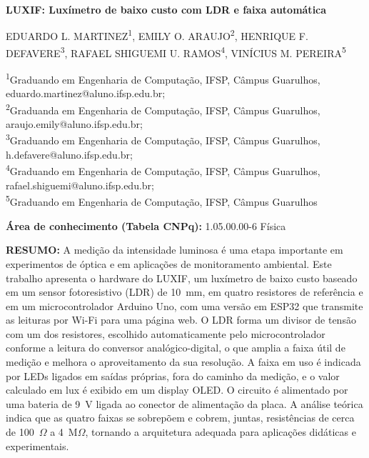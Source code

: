 \documentclass[11pt,a4paper]{article}
\begin{document}
\begin{center}
	{\Large\bfseries LUXIF: Luxímetro de baixo custo com LDR e faixa automática}

	\vspace{12pt}

	{\small
	EDUARDO L. MARTINEZ\textsuperscript{1}, EMILY O. ARAUJO\textsuperscript{2},
	HENRIQUE F. DEFAVERE\textsuperscript{3}, RAFAEL SHIGUEMI U. RAMOS\textsuperscript{4},
	VINÍCIUS M. PEREIRA\textsuperscript{5}}
\end{center}

\vspace{4pt}
{\footnotesize
\noindent\textsuperscript{1}Graduando em Engenharia de Computação, IFSP, Câmpus Guarulhos, eduardo.martinez@aluno.ifsp.edu.br;\\
\textsuperscript{2}Graduanda em Engenharia de Computação, IFSP, Câmpus Guarulhos, araujo.emily@aluno.ifsp.edu.br;\\
\textsuperscript{3}Graduando em Engenharia de Computação, IFSP, Câmpus Guarulhos, h.defavere@aluno.ifsp.edu.br;\\
\textsuperscript{4}Graduando em Engenharia de Computação, IFSP, Câmpus Guarulhos, rafael.shiguemi@aluno.ifsp.edu.br;\\
\textsuperscript{5}Graduando em Engenharia de Computação, IFSP, Câmpus Guarulhos}

\vspace{8pt}
\noindent\textbf{Área de conhecimento (Tabela CNPq):} 1.05.00.00-6 Física

\vspace{8pt}
\noindent\textbf{RESUMO:} A medição da intensidade luminosa é uma etapa importante em experimentos de óptica e em aplicações de monitoramento ambiental. Este trabalho apresenta o hardware do LUXIF, um luxímetro de baixo custo baseado em um sensor fotoresistivo (LDR) de 10~mm, em quatro resistores de referência e em um microcontrolador Arduino Uno, com uma versão em ESP32 que transmite as leituras por Wi-Fi para uma página web. O LDR forma um divisor de tensão com um dos resistores, escolhido automaticamente pelo microcontrolador conforme a leitura do conversor analógico-digital, o que amplia a faixa útil de medição e melhora o aproveitamento da sua resolução. A faixa em uso é indicada por LEDs ligados em saídas próprias, fora do caminho da medição, e o valor calculado em lux é exibido em um display OLED. O circuito é alimentado por uma bateria de 9~V ligada ao conector de alimentação da placa. A análise teórica indica que as quatro faixas se sobrepõem e cobrem, juntas, resistências de cerca de 100~$\Omega$ a 4~M$\Omega$, tornando a arquitetura adequada para aplicações didáticas e experimentais.
\end{document}
